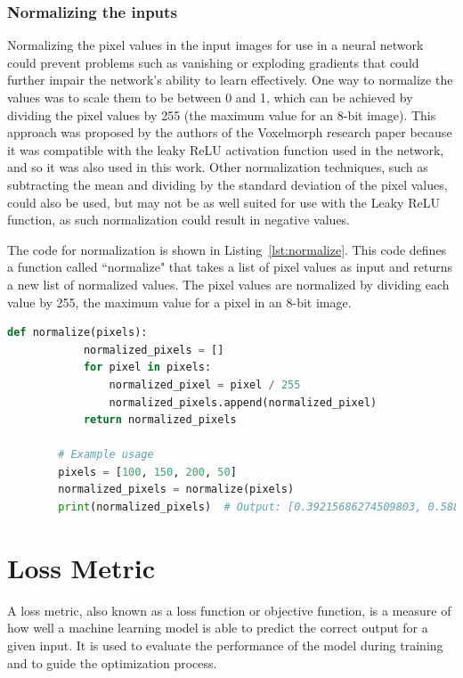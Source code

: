 \documentclass{book}
\begin{document}
	\subsubsection{Normalizing the inputs}
	Normalizing the pixel values in the input images for use in a neural network could prevent problems such as vanishing or exploding gradients that could further impair the network's ability to learn effectively. One way to normalize the values was to scale them to be between 0 and 1, which can be achieved by dividing the pixel values by 255 (the maximum value for an 8-bit image). This approach was proposed by the authors of the Voxelmorph research paper because it was compatible with the leaky ReLU activation function used in the network, and so it was also used in this work. Other normalization techniques, such as subtracting the mean and dividing by the standard deviation of the pixel values, could also be used, but may not be as well suited for use with the Leaky ReLU function, as such normalization could result in negative values.
	
	The code for normalization is shown in Listing~\ref{lst:normalize}. This code defines a function called ``normalize" that takes a list of pixel values as input and returns a new list of normalized values. The pixel values are normalized by dividing each value by 255, the maximum value for a pixel in an 8-bit image.
	\newpage
	
	\begin{lstlisting}[language=python, label=lst:normalize, caption=Pseudo function to show the normalization of pixel intensity values.]
		def normalize(pixels):
			normalized_pixels = []
			for pixel in pixels:
				normalized_pixel = pixel / 255
				normalized_pixels.append(normalized_pixel)
			return normalized_pixels
	
		# Example usage
		pixels = [100, 150, 200, 50]
		normalized_pixels = normalize(pixels)
		print(normalized_pixels)  # Output: [0.39215686274509803, 0.5882352941176471, 0.7843137254901961, 0.19607843137254902]
	\end{lstlisting}
	
	
	
	\section{Loss Metric}\label{sec:loss_metric}
	A loss metric, also known as a loss function or objective function, is a measure of how well a machine learning model is able to predict the correct output for a given input. It is used to evaluate the performance of the model during training and to guide the optimization process.
	
\end{document}

